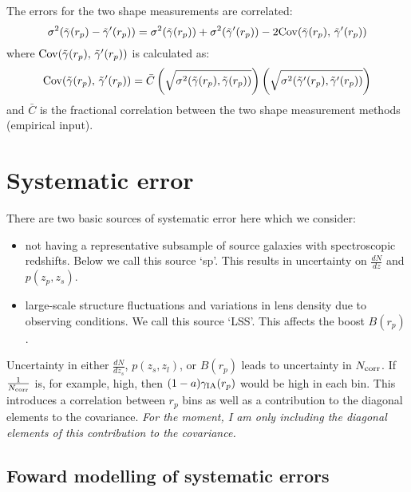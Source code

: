\documentclass[onecolumn,amsmath,aps,fleqn, superscriptaddress]{revtex4}
\begin{document}
The errors for the two shape measurements are correlated:
\begin{equation}
\sigma^2(\tilde{\gamma}(r_p) - \tilde{\gamma}^\prime(r_p)) = \sigma^2(\tilde{\gamma}(r_p)) + \sigma^2(\tilde{\gamma}^\prime(r_p)) - 2 {\rm Cov}( \tilde{\gamma}(r_p), \, \tilde{\gamma}^\prime(r_p))
\label{comb_gammat}
\end{equation}
where ${\rm Cov}( \tilde{\gamma}(r_p), \, \tilde{\gamma}^\prime(r_p))$ is calculated as:
\begin{equation}
{\rm Cov}( \tilde{\gamma}(r_p), \, \tilde{\gamma}^\prime(r_p)) = \bar{C} \left(\sqrt{\sigma^2(\tilde{\gamma}(r_p), \tilde{\gamma}(r_p))}\right)\left(\sqrt{\sigma^2(\tilde{\gamma}^\prime(r_p), \tilde{\gamma}^\prime(r_p))}\right)
\label{Cov}
\end{equation}
and $\bar{C}$ is the fractional correlation between the two shape measurement methods (empirical input).

\section*{Systematic error}

There are two basic sources of systematic error here which we consider:
\begin{itemize}
\item{not having a representative subsample of source galaxies with spectroscopic redshifts. Below we call this source `sp'. This results in uncertainty on $\frac{dN}{dz}$ and $p(z_p, z_s)$.}
\item{large-scale structure fluctuations and variations in lens density due to observing conditions. We call this source `LSS'. This affects the boost $B(r_p)$.}
\end{itemize}
Uncertainty in either $\frac{dN}{dz_s}$, $p(z_s, z_l)$, or $B(r_p)$ leads to uncertainty in $N_{\rm corr}$. If $\frac{1}{N_{\rm corr}}$ is, for example, high, then $(1-a)\gamma_{\rm IA}(r_p)$ would be high in each bin. This introduces a correlation between $r_p$ bins as well as a contribution to the diagonal elements to the covariance. {\it For the moment, I am only including the diagonal elements of this contribution to the covariance.}

\subsection{Foward modelling of systematic errors}
\end{document}
